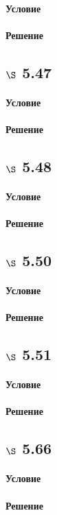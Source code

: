 \documentclass[a4paper,12pt]{article}
\begin{document}
\paragraph*{Условие}
\paragraph*{Решение}

\subsection*{$\S$ 5.47}
\paragraph*{Условие}
\paragraph*{Решение}

\subsection*{$\S$ 5.48}
\paragraph*{Условие}
\paragraph*{Решение}

\subsection*{$\S$ 5.50}
\paragraph*{Условие}
\paragraph*{Решение}

\subsection*{$\S$ 5.51}
\paragraph*{Условие}
\paragraph*{Решение}

\subsection*{$\S$ 5.66}
\paragraph*{Условие}
\paragraph*{Решение}
\end{document}
